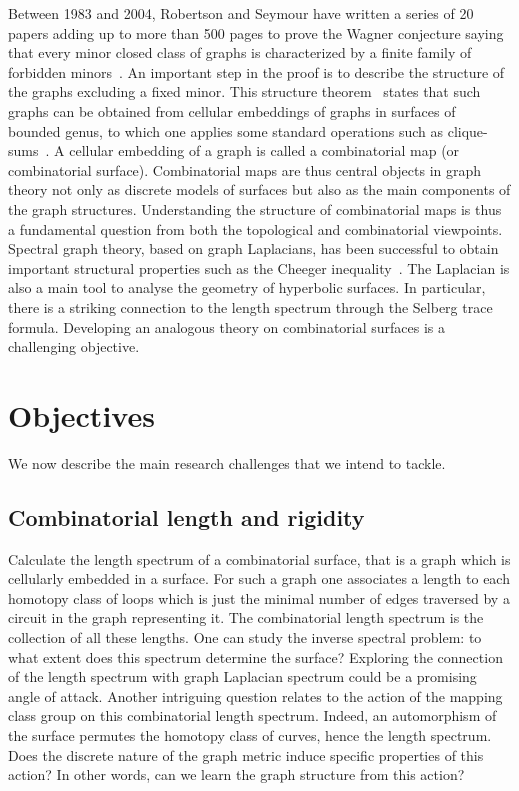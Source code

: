 \documentclass[14pt,fleqn]{article}
\begin{document}
Between 1983 and 2004, Robertson and Seymour have written a series of 20 papers adding up to more than 500 pages to prove the Wagner conjecture saying that every minor closed class of graphs is characterized by a finite family of forbidden minors~\cite{w-gt-70}.  An important step in the proof is to describe the structure of the graphs excluding a fixed minor. This structure theorem~\cite{rs-tv-99} states that such graphs can be obtained from cellular embeddings of graphs in surfaces of bounded genus, to which one applies some standard operations such as clique-sums~\cite{l-gmt-06}. A cellular embedding of a graph is called a combinatorial map (or combinatorial surface). Combinatorial maps are thus central objects in graph theory not only as discrete models of surfaces but also as the main components of the graph structures. Understanding the structure of combinatorial maps is thus a fundamental question from both the topological and combinatorial viewpoints. Spectral graph theory, based on graph Laplacians, has been successful to obtain important structural properties such as the Cheeger inequality~\cite{c-lbsel-70}. The Laplacian is also a main tool to analyse the geometry of hyperbolic surfaces. In particular, there is a striking connection to the length spectrum through the Selberg trace formula. Developing an analogous theory on combinatorial surfaces is a challenging objective.




\section{Objectives}
We now describe the main research challenges that we intend to tackle. 



\subsection{Combinatorial length and rigidity}
 Calculate the length
spectrum of a combinatorial surface, that is a graph which is
cellularly embedded in a surface.  For such a graph one associates a
length to each homotopy class of loops which is just the minimal
number of edges traversed by a circuit in the graph representing
it. The combinatorial length spectrum is the collection of all these
lengths. One can study the inverse spectral problem: to what extent
does this spectrum determine the surface? Exploring the connection of the length spectrum with graph Laplacian spectrum could be a promising angle of attack. Another intriguing question relates to the action of the mapping class group on this combinatorial length spectrum. Indeed, an automorphism of the
 surface permutes the homotopy class of curves, hence the length spectrum. Does the discrete nature of the graph metric induce specific properties of this action? In other words, can we learn the graph structure from this action?
\end{document}
